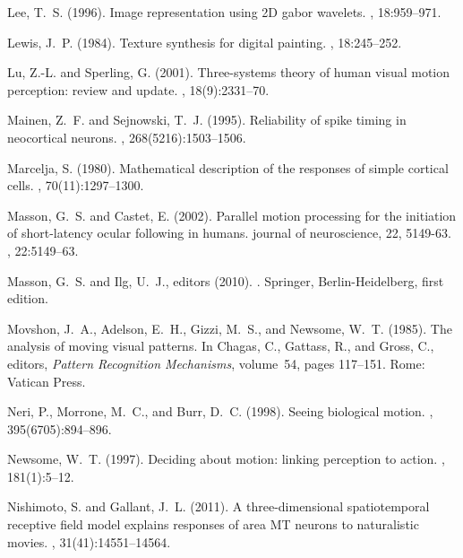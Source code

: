 \documentclass[a4paper,11pt]{article}%
\begin{document}
\begin{thebibliography}{}
Lee, T.~S. (1996).
\newblock Image representation using {2D} gabor wavelets.
, 18:959--971.

Lewis, J.~P. (1984).
\newblock Texture synthesis for digital painting.
, 18:245--252.

Lu, Z.-L. and Sperling, G. (2001).
\newblock Three-systems theory of human visual motion perception: review and
  update.
, 18(9):2331--70.

Mainen, Z.~F. and Sejnowski, T.~J. (1995).
\newblock Reliability of spike timing in neocortical neurons.
, 268(5216):1503--1506.

Marcelja, S. (1980).
\newblock Mathematical description of the responses of simple cortical cells.
, 70(11):1297--1300.

Masson, G.~S. and Castet, E. (2002).
\newblock Parallel motion processing for the initiation of short-latency ocular
  following in humans. journal of neuroscience, 22, 5149-63.
, 22:5149--63.

Masson, G.~S. and Ilg, U.~J., editors (2010).
.
\newblock Springer, Berlin-Heidelberg, first edition.

Movshon, J.~A., Adelson, E.~H., Gizzi, M.~S., and Newsome, W.~T. (1985).
\newblock The analysis of moving visual patterns.
\newblock In Chagas, C., Gattass, R., and Gross, C., editors, {\em Pattern
  Recognition Mechanisms}, volume~54, pages 117--151. Rome: Vatican Press.

Neri, P., Morrone, M.~C., and Burr, D.~C. (1998).
\newblock Seeing biological motion.
, 395(6705):894--896.

Newsome, W.~T. (1997).
\newblock Deciding about motion: linking perception to action.
,
  181(1):5--12.

Nishimoto, S. and Gallant, J.~L. (2011).
\newblock A three-dimensional spatiotemporal receptive field model explains
  responses of area {MT} neurons to naturalistic movies.
, 31(41):14551--14564.


\end{thebibliography}
\end{document}
